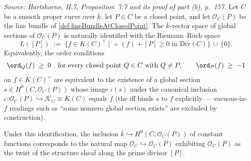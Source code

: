 \begin{lemma}



  \label{lem:lineBundleAtClosedPoint_globalSections_iff}
  
  \textit{Source: Hartshorne, II.7, Proposition~7.7 and its
  proof of part (b), p.~157.}
  Let \(C\) be a smooth proper curve over \(\bar k\), let \(P \in C\) be a
  closed point, and let \(\mathcal O_C(P)\) be the line bundle of
  \cref{def:lineBundleAtClosedPoint}. The \(\bar k\)-vector space of
  global sections of \(\mathcal O_C(P)\) is naturally identified with the
  Riemann--Roch space
  \[
    L([P]) \;:=\;
    \bigl\{f \in K(C)^{\times} \;\big|\; \div(f) + [P] \geq 0
    \text{ in } \mathrm{Div}(C)\bigr\}
    \,\cup\, \{0\}.
  \]
  Equivalently, the order conditions
  \[
    \ord_Q(f) \;\geq\; 0 \quad \text{for every closed point } Q \in C
    \text{ with } Q \neq P,
    \qquad
    \ord_P(f) \;\geq\; -1
  \]
  on \(f \in K(C)^{\times}\) are equivalent to the existence of a global
  section \(s \in H^0(C, \mathcal O_C(P))\) whose image \(\iota(s)\) under
  the canonical inclusion $\iota : \mathcal O_C(P) \hookrightarrow
  \mathcal K_C \cong K(C)$ equals $f$ (the iff binds $s$ to $f$
  explicitly — vacuous-in-\(f\) readings such as ``some nonzero global
  section exists'' are excluded by construction).

  Under this identification, the inclusion
  \(\bar k \hookrightarrow H^0(C, \mathcal O_C(P))\) of constant functions
  corresponds to the natural map $\mathcal O_C \hookrightarrow
  \mathcal O_C(P)$ exhibiting $\mathcal O_C(P)$ as the twist of the
  structure sheaf along the prime divisor \([P]\).
\end{lemma}

